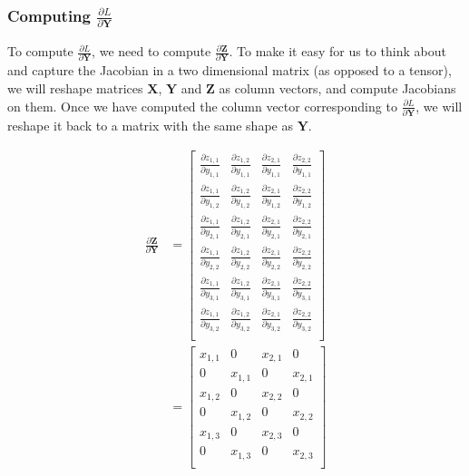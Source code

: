 \documentclass{article}
\newcommand{\matr}[1]{\mathbf{#1}} %
\begin{document}
\subsubsection{Computing $\frac{\partial L}{\partial \matr{Y}}$}
To compute $\frac{\partial L}{\partial \matr{Y}}$, we need to compute $\frac{\partial \matr{Z}}{\partial \matr{Y}}$. To make it easy for us to think about and capture the Jacobian in a two dimensional matrix (as opposed to a tensor), we will reshape matrices $\matr{X}$, $\matr{Y}$ and $\matr{Z}$ as column vectors, and compute Jacobians on them. Once we have computed the column vector corresponding to $\frac{\partial L}{\partial \matr{Y}}$, we will reshape it back to a matrix with the same shape as $\matr{Y}$.

\begin{align}
\frac{\partial \matr{Z}}{\partial \matr{Y}} &=
\begin{bmatrix}
\frac{\partial z_{1,1}}{\partial y_{1,1}} & \frac{\partial z_{1,2}}{\partial y_{1,1}} & \frac{\partial z_{2,1}}{\partial y_{1,1}} & \frac{\partial z_{2,2}}{\partial y_{1,1}} \\[0.5em]
\frac{\partial z_{1,1}}{\partial y_{1,2}} & \frac{\partial z_{1,2}}{\partial y_{1,2}} & \frac{\partial z_{2,1}}{\partial y_{1,2}} & \frac{\partial z_{2,2}}{\partial y_{1,2}} \\[0.5em]
\frac{\partial z_{1,1}}{\partial y_{2,1}} & \frac{\partial z_{1,2}}{\partial y_{2,1}} & \frac{\partial z_{2,1}}{\partial y_{2,1}} & \frac{\partial z_{2,2}}{\partial y_{2,1}} \\[0.5em]
\frac{\partial z_{1,1}}{\partial y_{2,2}} & \frac{\partial z_{1,2}}{\partial y_{2,2}} & \frac{\partial z_{2,1}}{\partial y_{2,2}} & \frac{\partial z_{2,2}}{\partial y_{2,2}} \\[0.5em]
\frac{\partial z_{1,1}}{\partial y_{3,1}} & \frac{\partial z_{1,2}}{\partial y_{3,1}} & \frac{\partial z_{2,1}}{\partial y_{3,1}} & \frac{\partial z_{2,2}}{\partial y_{3,1}} \\[0.5em]
\frac{\partial z_{1,1}}{\partial y_{3,2}} & \frac{\partial z_{1,2}}{\partial y_{3,2}} & \frac{\partial z_{2,1}}{\partial y_{3,2}} & \frac{\partial z_{2,2}}{\partial y_{3,2}} \\[0.5em]
\end{bmatrix} \nonumber
\\
&=
\begin{bmatrix}
x_{1,1} & 0 & x_{2,1} & 0 \\[0.5em]
0 & x_{1,1} & 0 & x_{2,1} \\[0.5em]
x_{1,2} & 0 & x_{2,2} & 0 \\[0.5em]
0 & x_{1,2} & 0 & x_{2,2} \\[0.5em]
x_{1,3} & 0 & x_{2,3} & 0 \\[0.5em]
0 & x_{1,3} & 0 & x_{2,3} \\[0.5em]
\end{bmatrix} \label{dZbydY}
\end{align}
\end{document}
